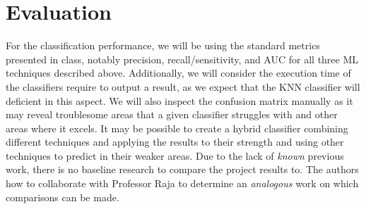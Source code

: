 \documentclass[12pt]{diazessay}
\begin{document}
\section*{Evaluation}

For the classification performance, we will be using the standard metrics presented in class, notably precision, recall/sensitivity, and AUC for all three ML techniques described above.
Additionally, we will consider the execution time of the classifiers require to output a result, as we expect that the KNN classifier will deficient in this aspect.
We will also inspect the confusion matrix manually as it may reveal troublesome areas that a given classifier struggles with and other areas where it excels.
It may be possible to create a hybrid classifier combining different techniques and applying the results to their strength and using other techniques to predict in their weaker areas.
Due to the lack of \emph{known} previous work, there is no baseline research to compare the project results to.
The authors how to collaborate with Professor Raja to determine an \emph{analogous} work on which comparisons can be made.

\clearpage



\end{document}
